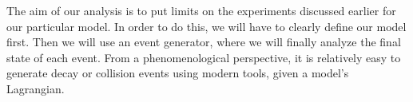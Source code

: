 \label{chapter:analysis}

The aim of our analysis is to put limits on the experiments discussed earlier for our particular model.
In order to do this, we will have to clearly define our model first.
Then we will use an event generator, where we will finally analyze the final state of each event.
From a phenomenological perspective, it is relatively easy to generate decay or collision events using modern tools, given a model's Lagrangian. 




